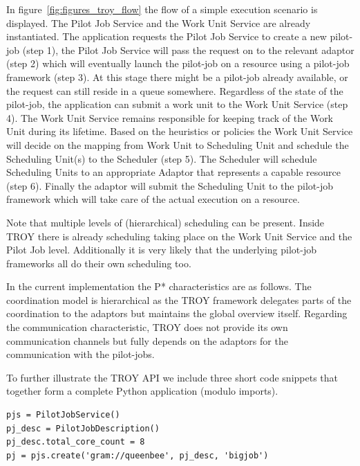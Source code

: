 \documentclass[conference,final]{IEEEtran}
\begin{document}
In figure~\ref{fig:figures_troy_flow} the flow of a simple execution scenario is
displayed. The Pilot Job Service and the Work Unit Service are already
instantiated. The application requests the Pilot Job Service to create a new
pilot-job (step 1), the Pilot Job Service will pass the request on to the
relevant adaptor (step 2) which will eventually launch the pilot-job on a
resource using a pilot-job framework (step 3). At this stage there might be a
pilot-job already available, or the request can still reside in a queue
somewhere. Regardless of the state of the pilot-job, the application can submit
a work unit to the Work Unit Service (step 4). The Work Unit Service remains
responsible for keeping track of the Work Unit during its lifetime. 
Based on the heuristics or policies the Work Unit Service will decide on the mapping
from Work Unit to Scheduling Unit  and schedule the Scheduling Unit(s) to the 
Scheduler (step 5).
The Scheduler will schedule Scheduling Units to an appropriate Adaptor that
represents a capable resource (step 6). 
Finally the adaptor will submit the Scheduling Unit to the pilot-job framework
which will take care of the actual execution on a resource.

Note that multiple levels of (hierarchical) scheduling can be present.
Inside TROY there is already scheduling taking place on the Work Unit Service and the Pilot Job level.
Additionally it is very likely that the underlying pilot-job frameworks all do their own scheduling too.

In the current implementation the P* characteristics are as follows.
The coordination model is hierarchical as the TROY framework delegates parts of the coordination to the adaptors but maintains the global overview itself.
Regarding the communication characteristic, TROY does not provide its own communication channels but fully depends on the adaptors for the communication with the pilot-jobs.

To further illustrate the TROY API we include three short code snippets that 
together form a complete Python application (modulo imports).

\noindent\begin{minipage}{0.47 \textwidth}
\begin{lstlisting}
pjs = PilotJobService()
pj_desc = PilotJobDescription()
pj_desc.total_core_count = 8
pj = pjs.create('gram://queenbee', pj_desc, 'bigjob')
\end{lstlisting}
\end{minipage}
\end{document}
